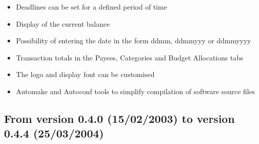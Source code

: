 \begin{itemize}
	\item Deadlines can be set for a defined period of time%
	\item Display of the current balance%
	\item Possibility of entering the date in the form ddmm, ddmmyyy or ddmmyyyy%
	\item Transaction totals in the Payees, Categories and Budget Allocations tabs%
	\item The logo and display font can be customised%
	\item Automake and Autoconf tools to simplify compilation of software source files%
\end{itemize}

\subsection{From version 0.4.0 \textnormal{(15/02/2003)} to version 0.4.4 \textnormal{(25/03/2004)}}

